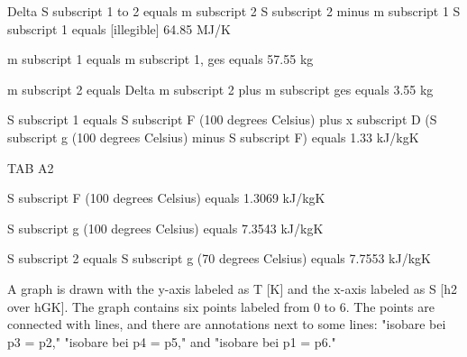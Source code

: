 Delta S subscript 1 to 2 equals m subscript 2 S subscript 2 minus m subscript 1 S subscript 1 equals [illegible] 64.85 MJ/K

m subscript 1 equals m subscript 1, ges equals 57.55 kg

m subscript 2 equals Delta m subscript 2 plus m subscript ges equals 3.55 kg

S subscript 1 equals S subscript F (100 degrees Celsius) plus x subscript D (S subscript g (100 degrees Celsius) minus S subscript F) equals 1.33 kJ/kgK

TAB A2

S subscript F (100 degrees Celsius) equals 1.3069 kJ/kgK

S subscript g (100 degrees Celsius) equals 7.3543 kJ/kgK

S subscript 2 equals S subscript g (70 degrees Celsius) equals 7.7553 kJ/kgK

A graph is drawn with the y-axis labeled as T [K] and the x-axis labeled as S [h2 over hGK]. The graph contains six points labeled from 0 to 6. The points are connected with lines, and there are annotations next to some lines: "isobare bei p3 = p2," "isobare bei p4 = p5," and "isobare bei p1 = p6."